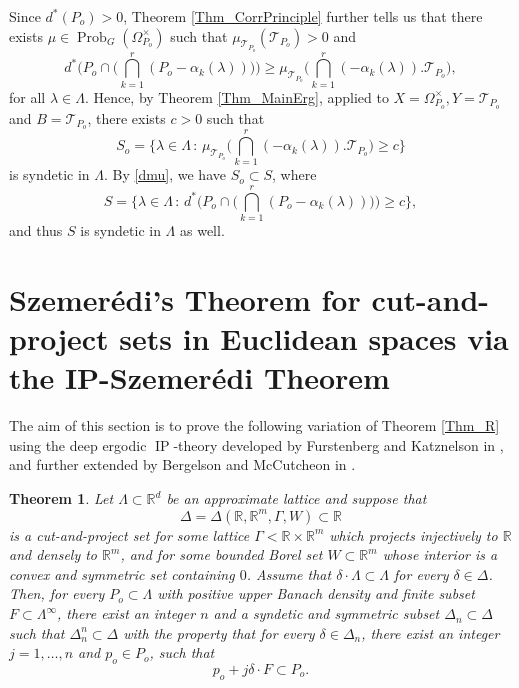 \documentclass[12pt,reqno,a4paper]{amsart}
\numberwithin{equation}{section}
\newcommand{\cT}{\mathcal{T}}
\newcommand{\bR}{\mathbb{R}}
\DeclareMathOperator{\Prob}{Prob}
\DeclareMathOperator{\IP}{IP}
\theoremstyle{theorem}
\newtheorem{theorem}{Theorem}[section]
\theoremstyle{task}
\theoremstyle{definition}
\begin{document}
Since $d^*(P_o) > 0$, Theorem \ref{Thm_CorrPrinciple} further tells us that there exists $\mu \in \Prob_{G}(\Omega^{\times}_{P_o})$ such that $\mu_{\cT_{P_o}}(\cT_{P_o}) > 0$ and
\begin{equation}
\label{dmu}
d^*\Big( P_o \cap \Big( \bigcap_{k=1}^r (P_o - \alpha_k(\lambda)) \Big) \Big) 
 \geq \mu_{\cT_{P_o}}\Big(\bigcap_{k=1}^r (-\alpha_k(\lambda)).\cT_{P_o}\Big),
\end{equation}
for all $\lambda \in \Lambda$. Hence, by Theorem \ref{Thm_MainErg}, 
applied to $X = \Omega_{P_o}^{\times}, Y = \cT_{P_o}$ and $B = \cT_{P_o}$,
there exists $c > 0$ such that
\[
S_o = \big\{ \lambda \in \Lambda \, : \, 
\mu_{\cT_{P_o}}\big(\bigcap_{k=1}^r (-\alpha_k(\lambda)).\cT_{P_o}\big) \geq c\big\}
\]
is syndetic in $\Lambda$. By \eqref{dmu}, we have $S_o \subset S$,
where
\[
S= \Big\{ \lambda \in \Lambda \, : \,  d^*\Big( P_o \cap \Big( \bigcap_{k=1}^r (P_o - \alpha_k(\lambda)) \Big) \Big)
\geq c\Big\},
\]
and thus $S$ is syndetic in $\Lambda$ as well.
\appendix

\section{Szemer\'edi's Theorem for cut-and-project sets in Euclidean spaces via the IP-Szemer\'edi Theorem}

The aim of this section is to prove the following variation of Theorem \ref{Thm_R}
using the deep ergodic $\IP$-theory developed by Furstenberg and Katznelson in \cite{FK2}, and further extended by Bergelson and McCutcheon in \cite{BM2}. 

\begin{theorem}
\label{Thm_Rext}
Let $\Lambda \subset \bR^d$ be an approximate lattice and suppose that 
\[
\Delta = \Delta(\bR,\bR^m,\Gamma,W) \subset \bR 
\]
is a cut-and-project set for some lattice $\Gamma < \bR \times \bR^m$ which projects injectively to 
$\bR$ and densely to $\bR^m$, and for some bounded Borel set $W \subset \bR^m$ whose interior
is a convex and symmetric set containing $0$. Assume that $\delta \cdot \Lambda \subset \Lambda$ for every $\delta \in \Delta$. Then, for every $P_o \subset \Lambda$
with positive upper Banach density and finite subset $F \subset \Lambda^\infty$, 
there exist an integer $n$ and a syndetic and symmetric subset $\Delta_n \subset \Delta$ such that
$\Delta_n^n \subset \Delta$ with the property that for every  $\delta \in \Delta_n$,
there exist an integer $j = 1,\ldots,n$ and $p_o \in P_o$, such that
\[
p_o + j\delta \cdot F \subset P_o.
\] 
\end{theorem}
\end{document}
